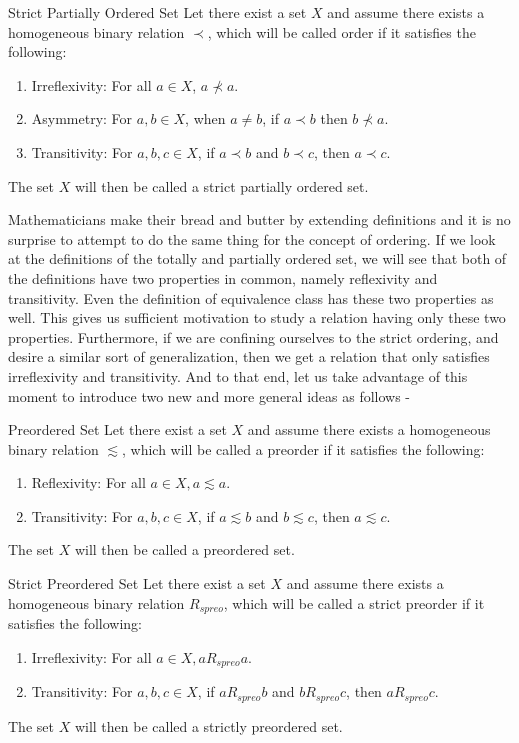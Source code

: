\begin{Definition}{Strict Partially Ordered Set}\label{strict_partially_ordered_set}
    Let there exist a set $X$ and assume there exists a homogeneous binary relation $\prec$, which will be called order if it satisfies the following:
    \begin{enumerate}
        \item Irreflexivity: For all $a\in X$, $a\nprec a$.
        \item Asymmetry: For $a,b\in X$, when $a\neq b$, if $a\prec b$ then $b\nprec a$.
        \item Transitivity: For $a,b,c\in X$, if $a\prec b$ and $b\prec c$, then $a\prec c$.
    \end{enumerate}
    The set $X$ will then be called a strict partially ordered set.
\end{Definition}
\noindent Mathematicians make their bread and butter by extending definitions and it is no surprise to attempt to do the same thing for the concept of ordering. If we look at the definitions of the totally and partially ordered set, we will see that both of the definitions have two properties in common, namely reflexivity and transitivity. Even the definition of equivalence class has these two properties as well. This gives us sufficient motivation to study a relation having only these two properties. Furthermore, if we are confining ourselves to the strict ordering, and desire a similar sort of generalization, then we get a relation that only satisfies irreflexivity and transitivity. And to that end, let us take advantage of this moment to introduce two new and more general ideas as follows -
\begin{Definition}{Preordered Set}\label{preordered_set}
    Let there exist a set $X$ and assume there exists a homogeneous binary relation $\lesssim$, which will be called a preorder if it satisfies the following:
    \begin{enumerate}
        \item Reflexivity: For all $a\in X,a\lesssim a$.
        \item Transitivity: For $a,b,c\in X$, if $a\lesssim b$ and $b\lesssim c$, then $a\lesssim c$.
    \end{enumerate}
    The set $X$ will then be called a preordered set.
\end{Definition}
\begin{Definition}{Strict Preordered Set}\label{strict_preordered_set}
	Let there exist a set $X$ and assume there exists a homogeneous binary relation $R_{spreo}$, which will be called a strict preorder if it satisfies the following:
	\begin{enumerate}
		\item Irreflexivity: For all $a\in X,a R_{spreo} a$.
		\item Transitivity: For $a,b,c\in X$, if $a R_{spreo} b$ and $b R_{spreo} c$, then $a R_{spreo} c$.
	\end{enumerate}
	The set $X$ will then be called a strictly preordered set.
\end{Definition}
